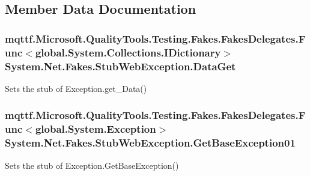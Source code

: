 \subsection{Member Data Documentation}
\hypertarget{class_system_1_1_net_1_1_fakes_1_1_stub_web_exception_a9db0a26b927d0fc21c33b96996c095a8}{
\subsubsection[{Data\-Get}]{\setlength{\rightskip}{0pt plus 5cm}mqttf.\-Microsoft.\-Quality\-Tools.\-Testing.\-Fakes.\-Fakes\-Delegates.\-Func$<$global.\-System.\-Collections.\-I\-Dictionary$>$ System.\-Net.\-Fakes.\-Stub\-Web\-Exception.\-Data\-Get}}\label{class_system_1_1_net_1_1_fakes_1_1_stub_web_exception_a9db0a26b927d0fc21c33b96996c095a8}


Sets the stub of Exception.\-get\-\_\-\-Data()

\hypertarget{class_system_1_1_net_1_1_fakes_1_1_stub_web_exception_ad1b04e0dece251e651365df80499376c}{
\subsubsection[{Get\-Base\-Exception01}]{\setlength{\rightskip}{0pt plus 5cm}mqttf.\-Microsoft.\-Quality\-Tools.\-Testing.\-Fakes.\-Fakes\-Delegates.\-Func$<$global.\-System.\-Exception$>$ System.\-Net.\-Fakes.\-Stub\-Web\-Exception.\-Get\-Base\-Exception01}}\label{class_system_1_1_net_1_1_fakes_1_1_stub_web_exception_ad1b04e0dece251e651365df80499376c}


Sets the stub of Exception.\-Get\-Base\-Exception()

